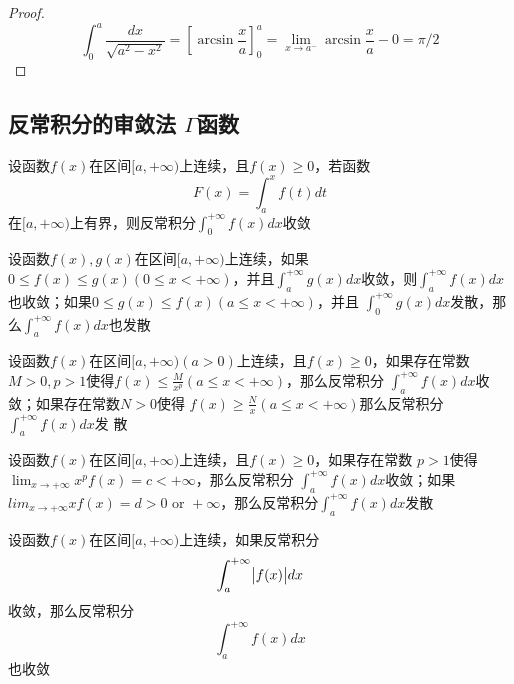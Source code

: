 \documentclass[11pt]{article}
\begin{document}
\begin{proof}
\begin{equation*}
\int_0^a\frac{dx}{\sqrt{a^2-x^2}}=[\arcsin\frac{x}{a}]^a_0=\lim_{x\to a^-}
\arcsin \frac{x}{a}-0=\pi/2
\end{equation*}
\end{proof}
\subsection{反常积分的审敛法 \(Γ\)函数}
\label{sec:org5e2f26b}
\begin{theorem}[]
设函数\(f(x)\)在区间\([a,+\infty)\)上连续，且\(f(x)\ge0\)，若函数
\begin{equation*}
F(x)=\int_a^xf(t)dt
\end{equation*}
在\([a,+\infty)\)上有界，则反常积分\(\int_0^{+\infty}f(x)dx\)收敛
\end{theorem}

\begin{theorem}[比较审敛原理]
设函数\(f(x),g(x)\)在区间\([a,+\infty)\)上连续，如果\(0\le f(x)\le g(x)(0\le
   x<+\infty)\)，并且\(\int_a^{+\infty}g(x)dx\)收敛，则\(\int_a^{+\infty}f(x)dx\)
也收敛；如果\(0\le g(x)\le f(x)(a\le x<+\infty)\)，并且
\(\int_0^{+\infty}g(x)dx\)发散，那么\(\int_a^{+\infty}f(x)dx\)也发散
\end{theorem}

\begin{theorem}[比较审敛法 1]
设函数\(f(x)\)在区间\([a,+\infty)(a>0)\)上连续，且\(f(x)\ge0\)，如果存在常数
\(M>0,p>1\)使得\(f(x)\le\frac{M}{x^p}(a\le x<+\infty)\)，那么反常积分
\(\int_a^{+\infty}f(x)dx\)收敛；如果存在常数\(N>0\)使得
\(f(x)\ge\frac{N}{x}(a\le x<+\infty)\)那么反常积分\(\int_a^{+\infty}f(x)dx\)发
散
\end{theorem}

\begin{theorem}[极限审敛法 1]
设函数\(f(x)\)在区间\([a,+\infty)\)上连续，且\(f(x)\ge0\)，如果存在常数
\(p>1\)使得\(\lim_{x\to+\infty}x^pf(x)=c<+\infty\)，那么反常积分
\(\int_a^{+\infty}f(x)dx\)收敛；如果\(lim_{x\to+\infty}xf(x)=d>0\text{ or
   }+\infty\)，那么反常积分\(\int_a^{+\infty}f(x)dx\)发散
\end{theorem}

\begin{theorem}[]
设函数\(f(x)\)在区间\([a,+\infty)\)上连续，如果反常积分
\begin{equation*}
\int_a^{+\infty}\abs{f(x)}dx
\end{equation*}
收敛，那么反常积分
\begin{equation*}
\int_a^{+\infty}f(x)dx
\end{equation*}
也收敛
\end{theorem}
\end{document}

